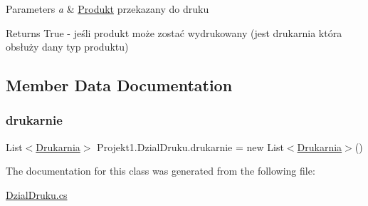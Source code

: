 \begin{DoxyParams}{Parameters}
{\em a} & \mbox{\hyperlink{class_projekt1_1_1_produkt}{Produkt}} przekazany do druku \\
\hline
\end{DoxyParams}
\begin{DoxyReturn}{Returns}
True -\/ jeśli produkt może zostać wydrukowany (jest drukarnia która obsłuży dany typ produktu) 
\end{DoxyReturn}


\subsection{Member Data Documentation}
\mbox{\label{class_projekt1_1_1_dzial_druku_acf9822fccb837b00ff5fc6030dedd232}} 
\subsubsection{\texorpdfstring{drukarnie}{drukarnie}}
{\footnotesize\ttfamily List$<$\mbox{\hyperlink{class_projekt1_1_1_drukarnia}{Drukarnia}}$>$ Projekt1.\+Dzial\+Druku.\+drukarnie = new List$<$\mbox{\hyperlink{class_projekt1_1_1_drukarnia}{Drukarnia}}$>$()\hspace{0.3cm}{\ttfamily [private]}}



The documentation for this class was generated from the following file\+:\begin{DoxyCompactItemize}
\item 
\mbox{\hyperlink{_dzial_druku_8cs}{Dzial\+Druku.\+cs}}\end{DoxyCompactItemize}
